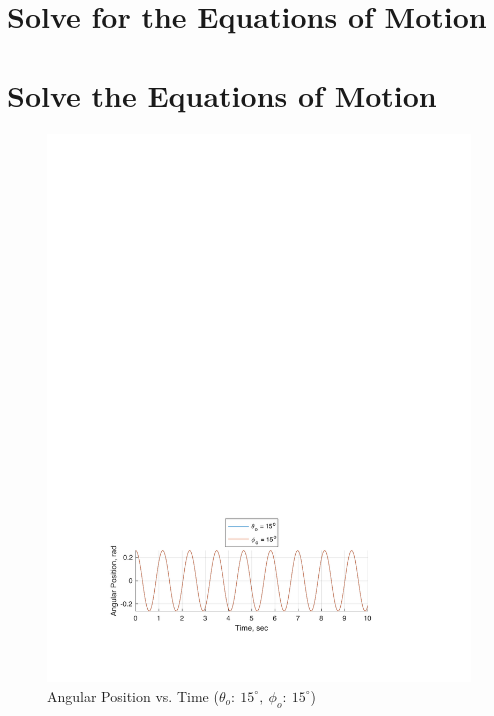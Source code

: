 \documentclass[12pt]{report}
\begin{document}
\begin{flushleft}
\section{Solve for the Equations of Motion}

\section{Solve the Equations of Motion}
\begin{figure}[ht]
  \includegraphics[center]{1}
  \caption{Angular Position vs. Time ($\theta_o:~15^\circ,~\phi_o:~15^\circ$)}
\end{figure}
\begin{figure}[ht]

\end{figure}
\end{flushleft}
\end{document}
